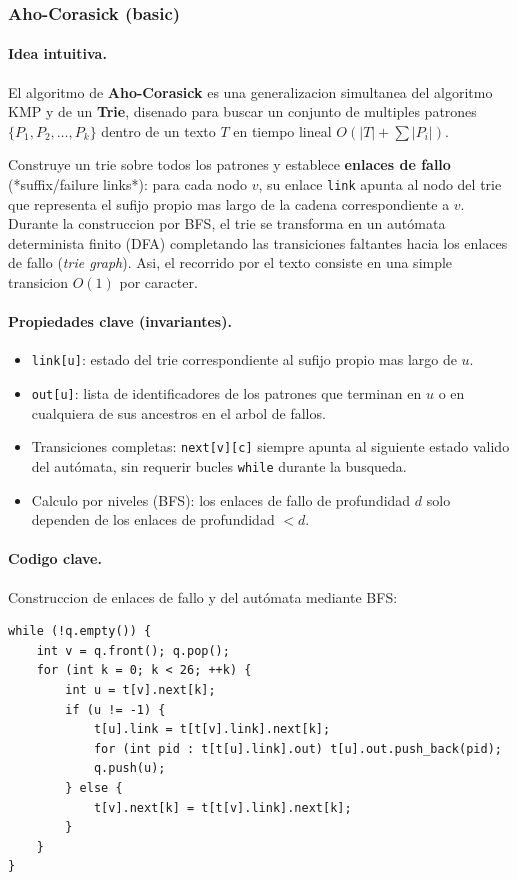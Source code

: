 \subsubsection{Aho-Corasick (basic)}

\paragraph{Idea intuitiva.}
El algoritmo de \textbf{Aho-Corasick} es una generalizacion simultanea del algoritmo KMP y de un \textbf{Trie}, disenado para buscar un conjunto de multiples patrones $\{P_1, P_2, \dots, P_k\}$ dentro de un texto $T$ en tiempo lineal $O(|T| + \sum |P_i|)$.

Construye un trie sobre todos los patrones y establece \textbf{enlaces de fallo} (*suffix/failure links*): para cada nodo $v$, su enlace \verb|link| apunta al nodo del trie que representa el sufijo propio mas largo de la cadena correspondiente a $v$. Durante la construccion por BFS, el trie se transforma en un autómata determinista finito (DFA) completando las transiciones faltantes hacia los enlaces de fallo (\textit{trie graph}). Asi, el recorrido por el texto consiste en una simple transicion $O(1)$ por caracter.

\paragraph{Propiedades clave (invariantes).}
\begin{itemize}\setlength\itemsep{0pt}
	\item \texttt{link[u]}: estado del trie correspondiente al sufijo propio mas largo de $u$.
	\item \texttt{out[u]}: lista de identificadores de los patrones que terminan en $u$ o en cualquiera de sus ancestros en el arbol de fallos.
	\item Transiciones completas: \verb|next[v][c]| siempre apunta al siguiente estado valido del autómata, sin requerir bucles \texttt{while} durante la busqueda.
	\item Calculo por niveles (BFS): los enlaces de fallo de profundidad $d$ solo dependen de los enlaces de profundidad $< d$.
\end{itemize}

\paragraph{Codigo clave.}
Construccion de enlaces de fallo y del autómata mediante BFS:
\begin{verbatim}
while (!q.empty()) {
    int v = q.front(); q.pop();
    for (int k = 0; k < 26; ++k) {
        int u = t[v].next[k];
        if (u != -1) {
            t[u].link = t[t[v].link].next[k];
            for (int pid : t[t[u].link].out) t[u].out.push_back(pid);
            q.push(u);
        } else {
            t[v].next[k] = t[t[v].link].next[k];
        }
    }
}
\end{verbatim}

